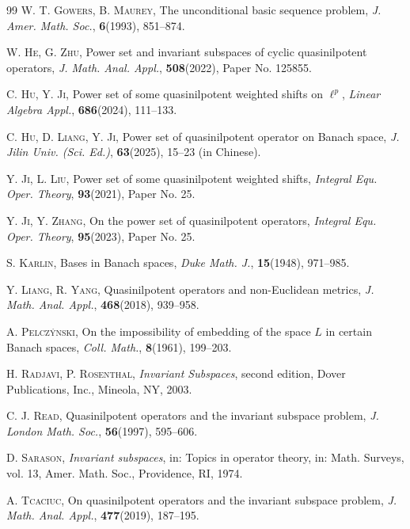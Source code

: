 \documentclass[12pt]{amsart}
\numberwithin{equation}{section}
\theoremstyle{plain}
\theoremstyle{definition}
\begin{document}
\begin{thebibliography}{99}
\textsc{W. T. Gowers, B. Maurey}, The unconditional basic sequence problem,
\textit{J. Amer. Math. Soc.}, \textbf{6}(1993), 851--874.


\textsc{W. He, G. Zhu}, Power set and invariant subspaces of cyclic quasinilpotent operators, \textit{J. Math. Anal. Appl.}, \textbf{508}(2022), Paper No. 125855.



\textsc{C. Hu, Y. Ji}, Power set of some quasinilpotent weighted shifts on  $\ell^p$, \textit{Linear Algebra Appl.}, \textbf{686}(2024), 111--133.



\textsc{C. Hu, D. Liang, Y. Ji}, Power set of quasinilpotent operator on Banach space, \textit{J. Jilin Univ. (Sci. Ed.)},  \textbf{63}(2025), 15--23 (in Chinese).


\textsc{Y. Ji, L. Liu}, Power set of some quasinilpotent weighted shifts,
\textit{Integral Equ. Oper. Theory}, \textbf{93}(2021), Paper No. 25.


\textsc{Y. Ji, Y. Zhang}, On the power set of quasinilpotent operators,
\textit{Integral Equ. Oper. Theory}, \textbf{95}(2023), Paper No. 25.


\textsc{S. Karlin}, Bases in Banach spaces, \textit{Duke Math. J.},
\textbf{15}(1948), 971--985.


\textsc{Y. Liang, R. Yang}, Quasinilpotent operators and non-Euclidean metrics,
\textit{J. Math. Anal. Appl.}, \textbf{468}(2018), 939--958.


\textsc{A. Pelcz\'{y}nski}, On the impossibility of embedding of the space $L$
in certain Banach spaces, \textit{Coll. Math.}, \textbf{8}(1961), 199--203.


\textsc{H. Radjavi, P. Rosenthal}, \textit{Invariant Subspaces}, second edition, Dover Publications, Inc., Mineola, NY, 2003.


\textsc{C. J. Read}, Quasinilpotent operators and the invariant subspace problem, \textit{J. London Math. Soc.}, \textbf{56}(1997), 595--606.


\textsc{D. Sarason}, \textit{Invariant subspaces}, in: Topics in operator theory, in: Math. Surveys, vol. 13, Amer. Math. Soc., Providence, RI, 1974.


\textsc{A. Tcaciuc}, On quasinilpotent operators and the invariant subspace problem, \textit{J. Math. Anal. Appl.}, \textbf{477}(2019), 187--195.

\end{thebibliography}
\end{document}
